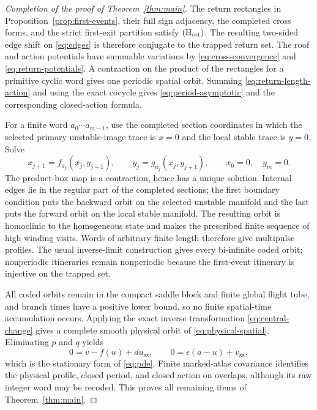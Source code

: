 \documentclass[11pt,reqno]{amsart}
\numberwithin{equation}{section}
\theoremstyle{definition}
\theoremstyle{remark}
\begin{document}
\begin{proof}[Completion of the proof of Theorem~\ref{thm:main}]
The return rectangles in Proposition~\ref{prop:first-events}, their full sign
adjacency, the completed cross forms, and the strict first-exit partition
satisfy ${\rm(H_{ret})}$.  The resulting two-sided edge shift on
\eqref{eq:edges} is therefore conjugate to the trapped return set.  The roof
and action potentials have summable variations by
\eqref{eq:cross-convergence} and \eqref{eq:return-potentials}.  A contraction
on the product of the rectangles for a primitive cyclic word gives one
periodic spatial orbit.  Summing \eqref{eq:return-length-action} and using
the exact cocycle gives \eqref{eq:period-asymptotic} and the corresponding
closed-action formula.

For a finite word $a_0\cdots a_{m-1}$, use the completed section
coordinates in which the selected primary unstable-image trace is $x=0$ and
the local stable trace is $y=0$.  Solve
\begin{equation}\label{eq:finite-word}
 x_{j+1}=f_{a_j}(x_j,y_{j+1}),\qquad
 y_j=g_{a_j}(x_j,y_{j+1}),\qquad
 x_0=0,\quad y_m=0.
\end{equation}
The product-box map is a contraction, hence has a unique solution.  Internal
edges lie in the regular part of the completed sections; the first boundary
condition puts the backward orbit on the selected unstable manifold and the
last puts the forward orbit on the local stable manifold.  The resulting
orbit is homoclinic to the homogeneous state and makes the prescribed finite
sequence of high-winding visits.  Words of arbitrary finite length therefore
give multipulse profiles.  The usual inverse-limit construction gives every
bi-infinite coded orbit; nonperiodic itineraries remain nonperiodic because
the first-event itinerary is injective on the trapped set.

All coded orbits remain in the compact saddle block and finite global flight
tube, and branch times have a positive lower bound, so no finite spatial-time
accumulation occurs.  Applying the exact inverse transformation
\eqref{eq:central-change} gives a complete smooth physical orbit of
\eqref{eq:physical-spatial}.  Eliminating $p$ and $q$ yields
\begin{equation}\label{eq:stationary-pde}
 0=v-f(u)+d u_{\mathsf x\mathsf x},\qquad
 0=\epsilon(a-u)+v_{\mathsf x\mathsf x},
\end{equation}
which is the stationary form of \eqref{eq:pde}.  Finite marked-atlas
covariance identifies the physical profile, closed period, and closed action
on overlaps, although its raw integer word may be recoded.  This proves all
remaining items of Theorem~\ref{thm:main}.
\end{proof}
\end{document}
